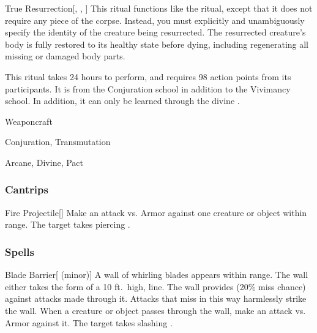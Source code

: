 \lowercase{\hypertarget{spell:True Resurrection}{}}\label{spell:True Resurrection}
\begin{apability}[\nth{7}]{\hypertarget{spell:True Resurrection}{True Resurrection}}[, , ]
This ritual functions like the  ritual, except that it does not require any piece of the corpse.
Instead, you must explicitly and unambiguously specify the identity of the creature being resurrected.
The resurrected creature's body is fully restored to its healthy state before dying, including regenerating all missing or damaged body parts.

This ritual takes 24 hours to perform, and requires 98 action points from its participants.
It is from the Conjuration school in addition to the Vivimancy school.
In addition, it can only be learned through the divine .
\end{apability}
\vspace{0.25em}


\newpage
\begin{spellsection}{Weaponcraft}

\begin{spellheader}
\end{spellheader}


 Conjuration, Transmutation

 Arcane, Divine, Pact

\subsubsection{Cantrips}


\begin{freeability}{Fire Projectile}[]
Make an attack vs. Armor against one creature or object within \rngmed range.
\hit The target takes piercing .
\end{freeability}

\end{spellsection}


\subsubsection{Spells}


\lowercase{\hypertarget{spell:Blade Barrier}{}}\label{spell:Blade Barrier}
\begin{apability}[\nth{1}]{\hypertarget{spell:Blade Barrier}{Blade Barrier}}[ (minor)]
A wall of whirling blades appears within \rngmed range.
The wall either takes the form of a 10 ft.\ high, \arealarge line.
The wall provides  (20\% miss chance) against attacks made through it.
Attacks that miss in this way harmlessly strike the wall.
When a creature or object passes through the wall, make an attack vs. Armor against it.
\hit The target takes slashing .
\end{apability}
\vspace{0.25em}



